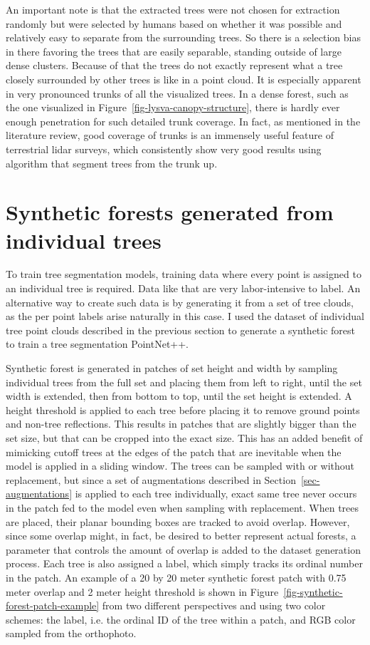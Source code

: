 An important note is that the extracted trees were not chosen for extraction randomly but were selected by humans based on whether it was possible and relatively easy to separate from the surrounding trees.
So there is a selection bias in there favoring the trees that are easily separable, standing outside of large dense clusters.
Because of that the trees do not exactly represent what a tree closely surrounded by other trees is like in a point cloud.
It is especially apparent in very pronounced trunks of all the visualized trees.
In a dense forest, such as the one visualized in Figure~\ref{fig-lysva-canopy-structure}, there is hardly ever enough penetration for such detailed trunk coverage.
In fact, as mentioned in the literature review, good coverage of trunks is an immensely useful feature of terrestrial \gls{lidar} surveys, which consistently show very good results using algorithm that segment trees from the trunk up.

\section{Synthetic forests generated from individual trees}\label{sec-synthetic-forest-dataset}

To train tree segmentation models, training data where every point is assigned to an individual tree is required.
Data like that are very labor-intensive to label.
An alternative way to create such data is by generating it from a set of tree clouds, as the per point labels arise naturally in this case.
I used the dataset of individual tree point clouds described in the previous section to generate a synthetic forest to train a tree segmentation PointNet++.

Synthetic forest is generated in patches of set height and width by sampling individual trees from the full set and placing them from left to right, until the set width is extended, then from bottom to top, until the set height is extended.
A height threshold is applied to each tree before placing it to remove ground points and non-tree reflections.
This results in patches that are slightly bigger than the set size, but that can be cropped into the exact size.
This has an added benefit of mimicking cutoff trees at the edges of the patch that are inevitable when the model is applied in a sliding window.
The trees can be sampled with or without replacement, but since a set of augmentations described in Section~\ref{sec-augmentations} is applied to each tree individually, exact same tree never occurs in the patch fed to the model even when sampling with replacement.
When trees are placed, their planar bounding boxes are tracked to avoid overlap.
However, since some overlap might, in fact, be desired to better represent actual forests, a parameter that controls the amount of overlap is added to the dataset generation process.
Each tree is also assigned a label, which simply tracks its ordinal number in the patch.
An example of a 20 by 20 meter synthetic forest patch with 0.75 meter overlap and 2 meter height threshold is shown in Figure~\ref{fig-synthetic-forest-patch-example} from two different perspectives and using two color schemes: the label, i.e. the ordinal ID of the tree within a patch, and RGB color sampled from the orthophoto.

